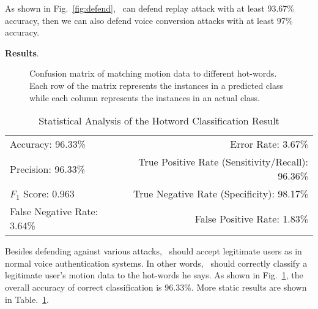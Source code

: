As shown in Fig.~\ref{fig:defend}, \shortname~can defend replay attack with at least 93.67\% accuracy, then we can also defend  voice conversion attacks with at least 97\% accuracy.











\textbf{Results}.
\begin{figure}[h]
	\centering
	\caption[Confusion Matrix of Matching Motion Data to Different Hot-Words. ]{Confusion matrix of matching motion data to different hot-words. Each row of the matrix represents the instances in a predicted class while each column represents the instances in an actual class.}
	\label{fig:commadmat}
\end{figure}
\begin{table}[t]
	\caption{Statistical Analysis of the Hotword Classification Result}
	\label{tab:commandTable}
	\centering
	\begin{tabular}{lr}
		\toprule
		Accuracy: 96.33\% & \hspace{-.55in} Error Rate: 3.67\% \\
		Precision: 96.33\% & \hspace{-.55in} True Positive Rate (Sensitivity/Recall): 96.36\% \\
		$F_1$ Score: 0.963 & \hspace{-.55in} True Negative Rate (Specificity): 98.17\% \\
		False Negative Rate: 3.64\%  & \hspace{-.55in} False Positive Rate: 1.83\% \\
		\bottomrule
	\end{tabular}
\end{table}

Besides defending against various attacks, \shortname~should accept legitimate users as in normal voice authentication systems. In other words, \shortname~should correctly classify a legitimate user's motion data to the hot-words he says. As shown in Fig.~\ref{fig:commadmat}, the overall accuracy of correct classification is 96.33\%.  More static results are shown in Table.~\ref{tab:commandTable}.



